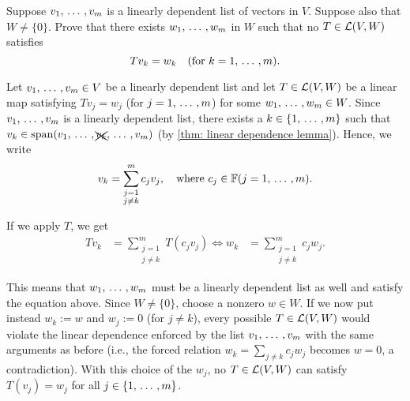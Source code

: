 \begin{xrcs}
  Suppose $v_1, {\, \ldots \,\,}, v_m$ is a linearly dependent list of vectors in $V$. Suppose also that $W \neq \{0\}$. Prove that there exists $w_1, {\, \ldots \,\,}, w_m$ in $W$ such that no $T \in \mathcal{L}(V,W)$ satisfies
  \begin{equation}
    Tv_k = w_k \quad \text{(for $k=1, {\, \ldots \,\,}, m$)}.
  \end{equation}
  \begin{xsol}
    Let $v_1, {\, \ldots \,\,}, v_m \in V$ be a linearly dependent list and let $T \in \mathcal{L}(V,W)$ be a linear map satisfying $T v_j = w_j$ (for $j=1, {\, \ldots \,\,}, m$) for some $w_1, {\, \ldots \,\,}, w_m \in W$.
    Since $v_1, {\, \ldots \,\,}, v_m$ is a linearly dependent list, there exists a $k \in \{1, {\, \ldots \,\,}, m\}$ such that $v_k \in \operatorname{span} (v_1, {\, \ldots \,\,}, \xcancel{v_k}, {\, \ldots \,\,}, v_m)$ (by \ref{thm: linear dependence lemma}). Hence, we write
    \begin{equation}
      v_k = \sum_{\substack{j = 1 \\ j \neq k}}^{m} c_j v_j, \quad \text{where } c_j \in \mathbb{F} (j=1,{\, \ldots \,\,},m).
    \end{equation}

    If we apply $T$, we get
    \begin{equation}
      \begin{aligned}
        T v_k &= \sum_{\substack{j = 1 \\ j \neq k}}^{m} T(c_j v_j) \iff
        w_k &= \sum_{\substack{j = 1 \\ j \neq k}}^{m} c_j w_j.
      \end{aligned}
    \end{equation}

    This means that $w_1, {\, \ldots \,\,}, w_m$ must be a linearly dependent list as well and satisfy the equation above. Since $W \neq \{0\}$, choose a nonzero $w \in W$. If we now put instead $w_k := w$ and $w_j := 0$ (for $j \neq k$), every possible $T \in \mathcal{L}(V,W)$ would violate the linear dependence enforced by the list $v_1, {\, \ldots \,\,}, v_m$ with the same arguments as before (i.e., the forced relation $w_k = \sum_{j \neq k} c_j w_j$ becomes $w=0$, a contradiction). With this choice of the $w_j$, no $T \in \mathcal{L} (V,W)$ can satisfy $T (v_j) = w_j$ for all $j \in \{1, {\, \ldots \,\,}, m\}$.
  \end{xsol}
\end{xrcs}